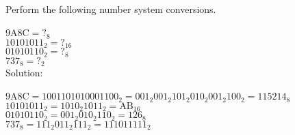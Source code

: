Perform the following number system conversions. \\
\\
$9\textrm{A}8\textrm{C} = ?_8$ \\
$10101011_2 = ?_{16}$ \\
$01010110_2 = ?_8$ \\
$737_8 = ?_2$ \\

Solution: \\
\\
$9\textrm{A}8\textrm{C} = 1001101010001100_2 = 001_2 001_2 101_2 010_2 001_2 100_2 = 115214_8$\\
$10101011_2 = 1010_2 1011_2 = \textrm{AB}_{16}$ \\
$01010110_2 = 001_2 010_2 110_2 = 126_8$ \\
$737_8 = 111_2 011_2 111_2 = 111011111_2$ \\
\\

